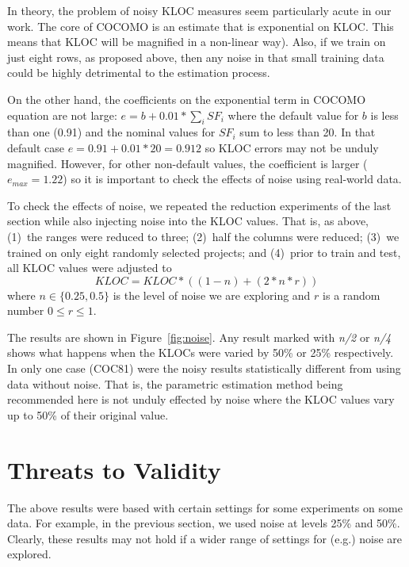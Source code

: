 \documentclass{sig-alternate}
\newcommand{\fig}[1]{Figure~\ref{fig:#1}}
\begin{document}
In theory, the  problem of noisy KLOC measures seem particularly acute in our work.
The core of COCOMO  is an estimate that is exponential on KLOC.
This means that 
 KLOC will be magnified in a non-linear way). 
Also, if we train on just eight rows, as proposed above,
then any noise in that small training data could be highly
detrimental to the estimation process.

On the other hand, the coefficients on the exponential term in  COCOMO equation are not
large: \mbox{$e=b+0.01*\sum_iSF_i$}
where the default value for $b$ is less than one (0.91) and the nominal values for $SF_i$ sum to less than 20.
In that default
case \mbox{$e=0.91+0.01*20= 0.912$} so KLOC errors may not be unduly magnified. However, for other non-default values,
the coefficient is larger ($e_{max}=1.22$) so it is important to check the effects of noise using real-world data.

To check the effects of noise, we repeated the reduction
experiments of the last section while also injecting
noise into the KLOC values.
That is, as above, 
(1)~the ranges were reduced to three;
(2)~half the columns were reduced;
(3)~we trained on only eight randomly selected projects; and 
(4)~prior to train and test, all KLOC values were adjusted
to
\[\mathit{KLOC} = \mathit{KLOC}*((1- n) + (2*n*r))\]
where $n \in \{0.25,0.5\}$ is the level of noise we are exploring and $r$ is a random number
$0 \le r \le 1$.

The results are shown in \fig{noise}. Any result
marked with {\em n/2} or {\em n/4} shows what happens
when the KLOCs were varied by 50\% or 25\% respectively.
In only one case (COC81) were the noisy results statistically
different from using data without noise. That is,
the parametric estimation method being recommended here is
not unduly effected by noise where the KLOC values
vary up to 50\% of their original value.




\section{Threats to Validity}

The above results were based with certain settings for some experiments on some data. 
For example, in the previous section, we used noise at levels 25\% and 50\%.
Clearly, these results may not hold if a wider range of settings for (e.g.) noise are explored.


\end{document}
